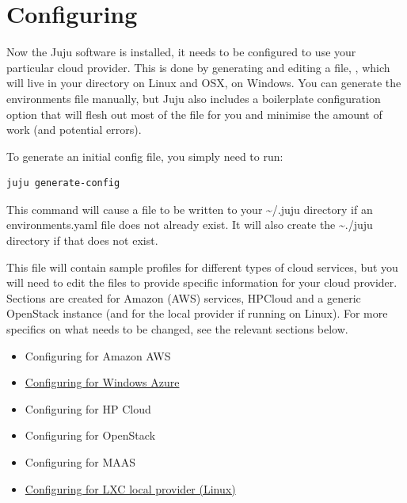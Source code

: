 \documentclass[letterpaper,10pt,english]{sphinxmanual}
\begin{document}
\chapter{Configuring}
\label{getting-started:configuring}
Now the Juju software is installed, it needs to be configured to use
your particular cloud provider. This is done by generating and editing
a file, , which will live in your 
directory on Linux and OSX,  on Windows. You can
generate the environments file manually, but Juju also includes a
boilerplate configuration option that will flesh out most of the file
for you and minimise the amount of work (and potential errors).

To generate an initial config file, you simply need to run:

\begin{Verbatim}[commandchars=\\\{\}]
juju generate-config
\end{Verbatim}

This command will cause a file to be written to your \textasciitilde{}/.juju directory
if an environments.yaml file does not already exist. It will also
create the \textasciitilde{}./juju directory if that does not exist.

This file will contain sample profiles for different types of cloud
services, but you will need to edit the files to provide specific
information for your cloud provider. Sections are created for Amazon
(AWS) services, HPCloud and a generic OpenStack instance (and for the
local provider if running on Linux). For more specifics on what needs
to be changed, see the relevant sections below.
\begin{itemize}
\item {} 
Configuring for Amazon AWS

\item {} 
\href{https://juju.ubuntu.com/config-azure.html}{Configuring for Windows Azure}

\item {} 
Configuring for HP Cloud

\item {} 
Configuring for OpenStack

\item {} 
Configuring for MAAS

\item {} 
\href{https://juju.ubuntu.com/config-local.html}{Configuring for LXC local provider (Linux)}

\end{itemize}
\end{document}
